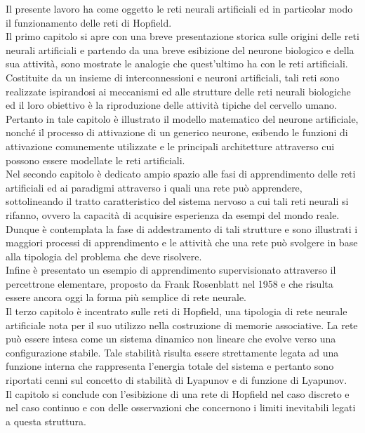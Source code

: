 \documentclass[12pt,a4paper,oneside]{book}
\begin{document}
Il presente lavoro ha come oggetto le reti neurali artificiali ed in particolar modo il funzionamento delle reti di Hopfield.\\
Il primo capitolo si apre con una breve presentazione storica sulle origini delle reti neurali artificiali e partendo da una breve esibizione del neurone biologico e della sua attività, sono mostrate le analogie che quest'ultimo ha con le reti artificiali. \\
Costituite da un insieme di interconnessioni e neuroni artificiali, tali reti sono realizzate ispirandosi ai meccanismi ed alle strutture delle reti neurali biologiche ed il loro obiettivo è la riproduzione delle attività tipiche del cervello umano. Pertanto in tale capitolo è illustrato il modello matematico del neurone artificiale, nonché il processo di attivazione di un generico neurone, esibendo le funzioni di attivazione comunemente utilizzate e le principali architetture attraverso cui possono essere modellate le reti artificiali.\\
Nel secondo capitolo è dedicato ampio spazio alle fasi di apprendimento delle reti artificiali ed ai paradigmi attraverso i quali una rete può apprendere, sottolineando il tratto caratteristico del sistema nervoso a cui tali reti neurali si rifanno, ovvero la capacità di acquisire esperienza da esempi del mondo reale. Dunque è contemplata la fase di addestramento di tali strutture e sono illustrati i maggiori processi di apprendimento e le attività che una rete può svolgere in base alla tipologia del problema che deve risolvere.\\
Infine è presentato un esempio di apprendimento supervisionato attraverso il percettrone elementare, proposto da Frank Rosenblatt nel 1958 e che risulta essere ancora oggi la forma più semplice di rete neurale.\\
Il terzo capitolo è incentrato sulle reti di Hopfield, una tipologia di rete neurale artificiale nota per il suo utilizzo nella costruzione di memorie associative. La rete può essere intesa come un sistema dinamico non lineare che evolve verso una configurazione stabile. Tale stabilità risulta essere strettamente legata ad una funzione interna che rappresenta l'energia totale del sistema e pertanto sono riportati cenni sul concetto di stabilità di Lyapunov e di funzione di Lyapunov.\\
Il capitolo si conclude con l'esibizione di una rete di Hopfield nel caso discreto e nel caso continuo e con delle osservazioni che concernono i limiti inevitabili legati a questa struttura.
\end{document}
